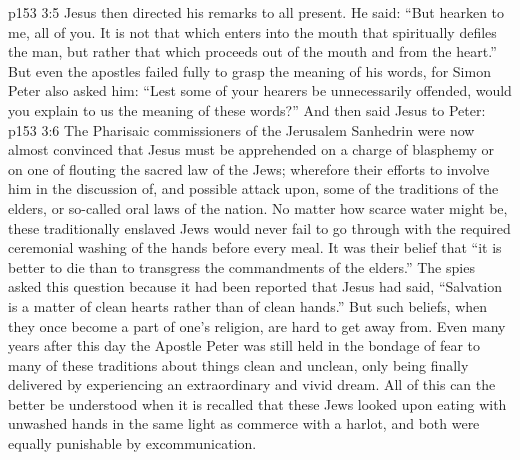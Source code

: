 \vs p153 3:5 Jesus then directed his remarks to all present. He said: “But hearken to me, all of you. It is not that which enters into the mouth that spiritually defiles the man, but rather that which proceeds out of the mouth and from the heart.” But even the apostles failed fully to grasp the meaning of his words, for Simon Peter also asked him: “Lest some of your hearers be unnecessarily offended, would you explain to us the meaning of these words?” And then said Jesus to Peter: 
\vs p153 3:6 The Pharisaic commissioners of the Jerusalem Sanhedrin were now almost convinced that Jesus must be apprehended on a charge of blasphemy or on one of flouting the sacred law of the Jews; wherefore their efforts to involve him in the discussion of, and possible attack upon, some of the traditions of the elders, or so\hyp{}called oral laws of the nation. No matter how scarce water might be, these traditionally enslaved Jews would never fail to go through with the required ceremonial washing of the hands before every meal. It was their belief that “it is better to die than to transgress the commandments of the elders.” The spies asked this question because it had been reported that Jesus had said, “Salvation is a matter of clean hearts rather than of clean hands.” But such beliefs, when they once become a part of one’s religion, are hard to get away from. Even many years after this day the Apostle Peter was still held in the bondage of fear to many of these traditions about things clean and unclean, only being finally delivered by experiencing an extraordinary and vivid dream. All of this can the better be understood when it is recalled that these Jews looked upon eating with unwashed hands in the same light as commerce with a harlot, and both were equally punishable by excommunication.
